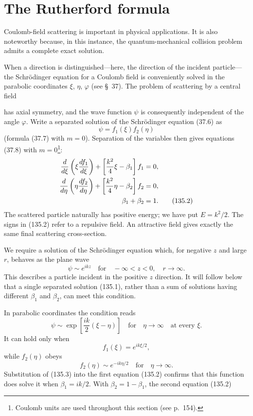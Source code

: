 \section{The Rutherford formula}

Coulomb-field scattering is important in physical applications. It is also
noteworthy because, in this instance, the quantum-mechanical collision problem
admits a complete exact solution.

When a direction is distinguished---here, the direction of the incident
particle---the Schr\"odinger equation for a Coulomb field is conveniently
solved in the parabolic coordinates $\xi$, $\eta$, $\varphi$ (see \S~37). The
problem of scattering by a central field

has axial symmetry, and the wave function $\psi$ is consequently independent
of the angle $\varphi$. Write a separated solution of the Schr\"odinger
equation (37.6) as
\begin{equation}
 \psi=f_1(\xi)f_2(\eta)
 \tag{135.1}
\end{equation}
(formula (37.7) with $m=0$). Separation of the variables then gives equations
(37.8) with $m=0$\footnote{Coulomb units are used throughout this section (see
p.~154).}:
\begin{align}
 \frac{d}{d\xi}\left(\xi\frac{df_1}{d\xi}\right)
 +\left[\frac{k^2}{4}\xi-\beta_1\right]f_1&=0, \notag\\
 \frac{d}{d\eta}\left(\eta\frac{df_2}{d\eta}\right)
 +\left[\frac{k^2}{4}\eta-\beta_2\right]f_2&=0, \notag\\
 \beta_1+\beta_2&=1.
 \tag{135.2}
\end{align}
The scattered particle naturally has positive energy; we have put $E=k^2/2$.
The signs in (135.2) refer to a repulsive field. An attractive field gives
exactly the same final scattering cross-section.

We require a solution of the Schr\"odinger equation which, for negative $z$
and large $r$, behaves as the plane wave
\[
 \psi\sim e^{ikz}\quad\text{for}\quad-\infty<z<0,\quad r\to\infty.
\]
This describes a particle incident in the positive $z$ direction. It will
follow below that a single separated solution (135.1), rather than a sum of
solutions having different $\beta_1$ and $\beta_2$, can meet this condition.

In parabolic coordinates the condition reads
\[
 \psi\sim\exp\left[\frac{ik}{2}(\xi-\eta)\right]
 \quad\text{for}\quad\eta\to\infty\quad\text{at every }\xi.
\]
It can hold only when
\begin{equation}
 f_1(\xi)=e^{ik\xi/2},
 \tag{135.3}
\end{equation}
while $f_2(\eta)$ obeys
\begin{equation}
 f_2(\eta)\sim e^{-ik\eta/2}\quad\text{for}\quad\eta\to\infty.
 \tag{135.4}
\end{equation}
Substitution of (135.3) into the first equation (135.2) confirms that this
function does solve it when $\beta_1=ik/2$. With
$\beta_2=1-\beta_1$, the second equation (135.2)

